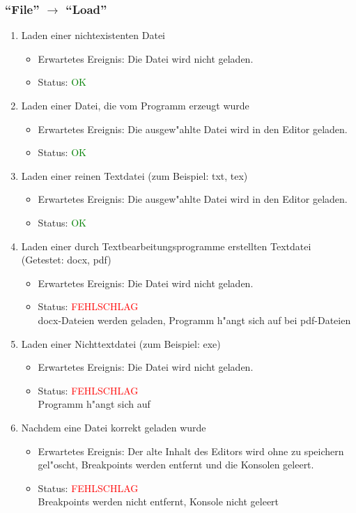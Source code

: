 \subsubsection{"`File"' $\rightarrow$ "`Load"'}
\begin{enumerate}
\item Laden einer nichtexistenten Datei
\begin{itemize}
\item Erwartetes Ereignis: Die Datei wird nicht geladen. 
\item Status: \textcolor{green}{OK} 
\end{itemize}
\item Laden einer Datei, die vom Programm erzeugt wurde
\begin{itemize}
\item Erwartetes Ereignis: Die ausgew"ahlte Datei wird in den Editor geladen. 
\item Status: \textcolor{green}{OK}
\end{itemize}
\item Laden einer reinen Textdatei (zum Beispiel: txt, tex)
\begin{itemize}
\item Erwartetes Ereignis: Die ausgew"ahlte Datei wird in den Editor geladen. 
\item Status: \textcolor{green}{OK}
\end{itemize}
\item Laden einer durch Textbearbeitungsprogramme erstellten Textdatei (Getestet: docx, pdf)
\begin{itemize}
\item Erwartetes Ereignis: Die Datei wird nicht geladen. 
\item Status: \textcolor{red}{FEHLSCHLAG} \\
docx-Dateien werden geladen, Programm h"angt sich auf bei pdf-Dateien
\end{itemize}
\item Laden einer Nichttextdatei (zum Beispiel: exe)
\begin{itemize}
\item Erwartetes Ereignis: Die Datei wird nicht geladen. 
\item Status: \textcolor{red}{FEHLSCHLAG} \\
Programm h"angt sich auf
\end{itemize}
\item Nachdem eine Datei korrekt geladen wurde
\begin{itemize}
\item Erwartetes Ereignis: Der alte Inhalt des Editors wird ohne zu speichern gel"oscht, Breakpoints werden entfernt und die Konsolen geleert. 
\item Status: \textcolor{red}{FEHLSCHLAG} \\
Breakpoints werden nicht entfernt, Konsole nicht geleert
\end{itemize}
\end{enumerate}
